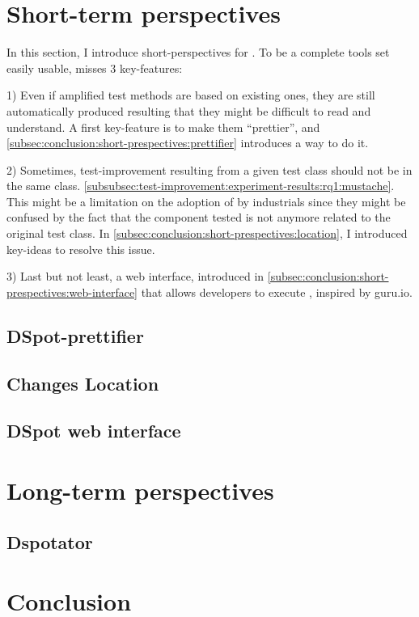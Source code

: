 \section{Short-term perspectives}
\label{sec:conclusion:short-prespectives}

In this section, I introduce short-perspectives for \dspot.
To be a complete tools set easily usable, \dspot misses 3 key-features:

1) Even if amplified test methods are based on existing ones, they are still automatically produced resulting that they might be difficult to read and understand.
A first key-feature is to make them ``prettier'', and \autoref{subsec:conclusion:short-prespectives:prettifier} introduces a way to do it.

2) Sometimes, test-improvement resulting from a given test class should not be in the same class. \eg \autoref{subsubsec:test-improvement:experiment-results:rq1:mustache}.
This might be a limitation on the adoption of \dspot by industrials since they might be confused by the fact that the component tested is not anymore related to the original test class.
In \autoref{subsec:conclusion:short-prespectives:location}, I introduced key-ideas to resolve this issue.

3) Last but not least, a web interface, introduced in \autoref{subsec:conclusion:short-prespectives:web-interface} that allows developers to execute \dspot, inspired by guru.io.

\subsection{DSpot-prettifier}
\label{subsec:conclusion:short-prespectives:prettifier}

\subsection{Changes Location}
\label{subsec:conclusion:short-prespectives:location}

\subsection{DSpot web interface}
\label{subsec:conclusion:short-prespectives:web-interface}



\section{Long-term perspectives}
\label{sec:conclusion:long-prespectives}
\subsection{Dspotator}

\section{Conclusion}
\label{sec:conclusion:conclusion}



